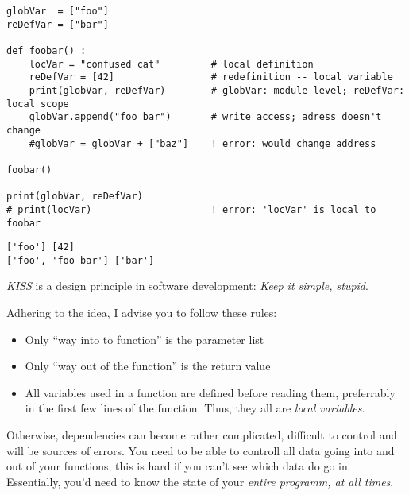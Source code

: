 
\begin{frame}[fragile]
%
\begin{codebox}
\begin{verbatim}
globVar  = ["foo"]
reDefVar = ["bar"]

def foobar() :
    locVar = "confused cat"         # local definition
    reDefVar = [42]                 # redefinition -- local variable
    print(globVar, reDefVar)        # globVar: module level; reDefVar: local scope
    globVar.append("foo bar")       # write access; adress doesn't change
    #globVar = globVar + ["baz"]    ! error: would change address

foobar()

print(globVar, reDefVar)
# print(locVar)                     ! error: 'locVar' is local to foobar
\end{verbatim}
\end{codebox}
\begin{cmdbox}
\begin{verbatim}
['foo'] [42]
['foo', 'foo bar'] ['bar']
\end{verbatim}
\end{cmdbox}
%
\end{frame}


\begin{frame}
%
\begin{hintbox}
\emph{KISS} is a design principle in software development: \emph{Keep it simple, stupid}.

Adhering to the idea, I advise you to follow these rules:

\begin{itemize}
\item Only \enquote{way into to function} is the parameter list
\item Only \enquote{way out of the function} is the return value
\item All variables used in a function are defined before reading them, preferrably in the first few lines of the function. Thus, they all are \emph{local variables}.
\end{itemize}

Otherwise, dependencies can become rather complicated, difficult to control and will be sources of errors. You need to be able to controll all data going into and out of your functions; this is hard if you can't see which data do go in. Essentially, you'd need to know the state of your \emph{entire programm, at all times}.
\end{hintbox}
%
\end{frame}
